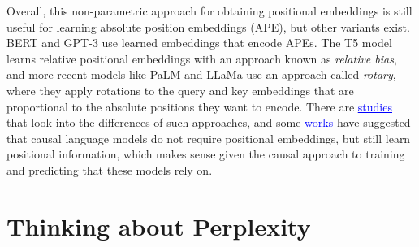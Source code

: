\documentclass[11pt,a4paper]{article}
\begin{document}
\begin{enumerate}[label=(\alph*)]
\begin{enumerate}[label=(\roman*)]
                    Overall, this non-parametric approach for obtaining
                    positional embeddings is still useful for learning absolute
                    position embeddings (APE), but other variants exist.
                    BERT and GPT-3 use learned embeddings that encode APEs.
                    The T5 model learns relative positional embeddings with an
                    approach known as \emph{relative bias}, and more recent
                    models like PaLM and LLaMa use an approach called
                    \emph{rotary}, where they apply rotations to the query and
                    key embeddings that are proportional to the absolute
                    positions they want to encode.
                    There are
                    \href{https://arxiv.org/pdf/2305.19466.pdf}{\textcolor{blue}{\underline{studies}}}
                    that look into the differences of such approaches, and some
                    \href{https://aclanthology.org/2022.findings-emnlp.99.pdf}{\textcolor{blue}{\underline{works}}}
                    have suggested that causal language models do not require
                    positional embeddings, but still learn positional
                    information, which makes sense given the causal approach
                    to training and predicting that these models rely on.
          \end{enumerate}
\end{enumerate}

\section{Thinking about Perplexity}
\end{document}
